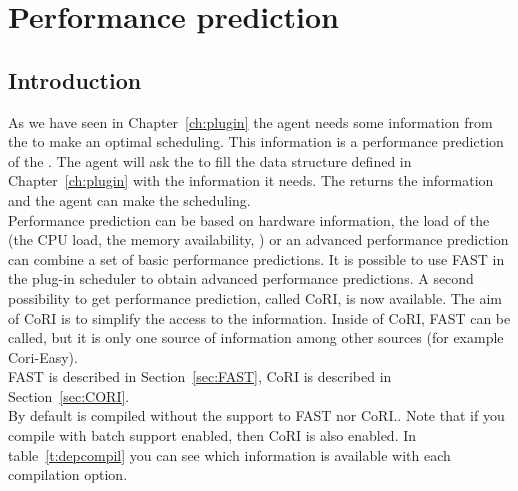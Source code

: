 
\chapter{Performance prediction}
\label{chapter:performance}
\section{Introduction}

As we have seen in Chapter~\ref{ch:plugin} the agent needs some information
from the \sed to make an optimal scheduling. This information is a performance
prediction of the \sed. The agent will ask the \sed to fill the data structure
defined in Chapter~\ref{ch:plugin} with the information it needs. The \sed
returns the information and the agent can make the scheduling.\\ Performance
prediction can be based on hardware information, the load of the \sed (the CPU
load, the memory availability, \etc) or an advanced performance prediction can
combine a set of basic performance predictions. It is possible to use FAST in
the plug-in scheduler to obtain advanced performance predictions. A second
possibility to get performance prediction, called CoRI, is now available.  The
aim of CoRI is to simplify the access to the information. Inside of CoRI, FAST
can be called, but it is only one source of information among other sources
(for example Cori-Easy).\\ FAST is described in Section~\ref{sec:FAST}, CoRI is
described in Section~\ref{sec:CORI}.\\ By default \diet is compiled without the
support to FAST nor CoRI.. Note that if you compile with batch support enabled, then
CoRI is also enabled.  In table~\ref{t:depcompil} you can see which
information is available with each compilation option.

